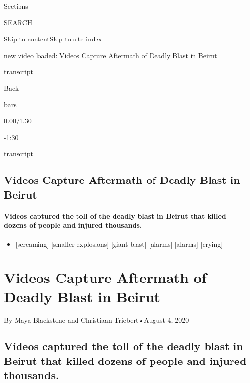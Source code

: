 Sections

SEARCH

\protect\hyperlink{site-content}{Skip to
content}\protect\hyperlink{site-index}{Skip to site index}

new video loaded: Videos Capture Aftermath of Deadly Blast in Beirut

transcript

Back

bars

0:00/1:30

-1:30

transcript

\hypertarget{videos-capture-aftermath-of-deadly-blast-in-beirut}{%
\subsection{Videos Capture Aftermath of Deadly Blast in
Beirut}\label{videos-capture-aftermath-of-deadly-blast-in-beirut}}

\hypertarget{videos-captured-the-toll-of-the-deadly-blast-in-beirut-that-killed-dozens-of-people-and-injured-thousands}{%
\paragraph{Videos captured the toll of the deadly blast in Beirut that
killed dozens of people and injured
thousands.}\label{videos-captured-the-toll-of-the-deadly-blast-in-beirut-that-killed-dozens-of-people-and-injured-thousands}}

\begin{itemize}
\tightlist
\item
  {[}screaming{]} {[}smaller explosions{]} {[}giant blast{]}
  {[}alarms{]} {[}alarms{]} {[}crying{]}
\end{itemize}

\hypertarget{videos-capture-aftermath-of-deadly-blast-in-beirut-1}{%
\section{Videos Capture Aftermath of Deadly Blast in
Beirut}\label{videos-capture-aftermath-of-deadly-blast-in-beirut-1}}

By Maya Blackstone and Christiaan Triebert•August 4, 2020

\hypertarget{videos-captured-the-toll-of-the-deadly-blast-in-beirut-that-killed-dozens-of-people-and-injured-thousands-1}{%
\subsection{Videos captured the toll of the deadly blast in Beirut that
killed dozens of people and injured
thousands.}\label{videos-captured-the-toll-of-the-deadly-blast-in-beirut-that-killed-dozens-of-people-and-injured-thousands-1}}

